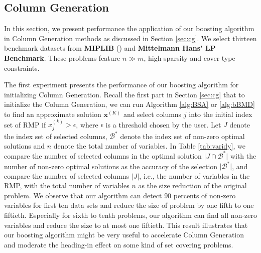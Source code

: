 \documentclass{article} %
\begin{document}
\subsection{Column Generation}
\label{sec:expcg}
In this section, we present performance the application of our boosting algorithm in Column Generation methods as discussed in Section \ref{sec:cg}. We select thirteen benchmark datasets from \textbf{MIPLIB} (\cite{MIPLIB}) and \textbf{Mittelmann Hans' LP Benchmark}. These problems feature $n \gg m$, high sparsity and cover type constraints. 

The first experiment presents the performance of our boosting algorithm for initializing Column Generation. Recall the first part in Section \ref{sec:cg} that to initialize the Column Generation, we can run Algorithm \ref{alg:BSA} or \ref{alg:bBMD} to find an approximate solution $\bm{x}^{(K)}$ and select columns $j$ into the initial index set of RMP if $x_j^{(k)}>\epsilon$, where $\epsilon$ is a threshold chosen by the user. Let $J$ denote the index set of selected columns, $\mathcal{B}^*$ denote the index set of non-zero optimal solutions and $n$ denote the total number of variables. In Table \ref{tab:varidy}, we compare the number of selected columns in the optimal solution $\vert J\cap \mathcal{B}^*\vert$ with the number of non-zero optimal solutions as the accuracy of the selection $\vert\mathcal{B}^*\vert$, and compare the number of selected columns $\vert J\vert$, i.e., the number of variables in the RMP, with the total number of variables $n$ as the size reduction of the original problem. We observe that our algorithm can detect $90$ percents of non-zero variables for first ten data sets and reduce the size of problem by one fifth to one fiftieth. Especially for sixth to tenth problems, our algorithm can find all non-zero variables and reduce the size to at most one fiftieth. This result illustrates that our boosting algorithm might be very useful to accelerate Column Generation and moderate the heading-in effect on some kind of set covering problems.
\end{document}
